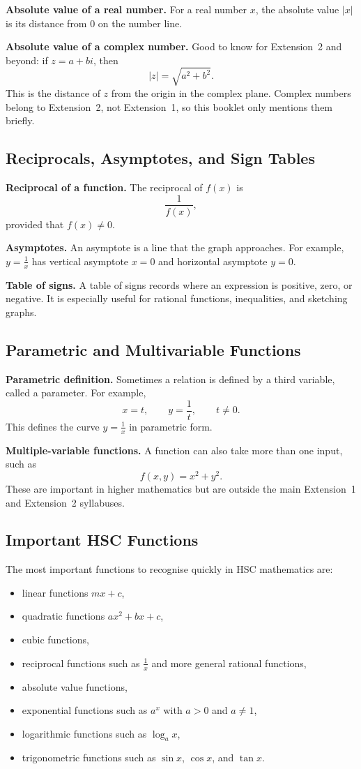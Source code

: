 \documentclass[12pt]{article}
\theoremstyle{definition}
\begin{document}
\textbf{Absolute value of a real number.} For a real number $x$, the absolute value $|x|$ is its distance from $0$ on the number line.

\textbf{Absolute value of a complex number.} Good to know for Extension~2 and beyond: if $z=a+bi$, then
\[
|z|=\sqrt{a^2+b^2}.
\]
This is the distance of $z$ from the origin in the complex plane. Complex numbers belong to Extension~2, not Extension~1, so this booklet only mentions them briefly.

\subsection{Reciprocals, Asymptotes, and Sign Tables}

\textbf{Reciprocal of a function.} The reciprocal of $f(x)$ is
\[
\frac{1}{f(x)},
\]
provided that $f(x) \ne 0$.

\textbf{Asymptotes.} An asymptote is a line that the graph approaches. For example, $y=\frac{1}{x}$ has vertical asymptote $x=0$ and horizontal asymptote $y=0$.

\textbf{Table of signs.} A table of signs records where an expression is positive, zero, or negative. It is especially useful for rational functions, inequalities, and sketching graphs.

\subsection{Parametric and Multivariable Functions}

\textbf{Parametric definition.} Sometimes a relation is defined by a third variable, called a parameter. For example,
\[
x=t, \qquad y=\frac{1}{t}, \qquad t \ne 0.
\]
This defines the curve $y=\frac{1}{x}$ in parametric form.

\textbf{Multiple-variable functions.} A function can also take more than one input, such as
\[
f(x,y)=x^2+y^2.
\]
These are important in higher mathematics but are outside the main Extension~1 and Extension~2 syllabuses.

\subsection{Important HSC Functions}

The most important functions to recognise quickly in HSC mathematics are:

\begin{itemize}[leftmargin=*]
  \item linear functions $mx+c$,
  \item quadratic functions $ax^2+bx+c$,
  \item cubic functions,
  \item reciprocal functions such as $\frac{1}{x}$ and more general rational functions,
  \item absolute value functions,
  \item exponential functions such as $a^x$ with $a>0$ and $a \ne 1$,
  \item logarithmic functions such as $\log_a x$,
  \item trigonometric functions such as $\sin x$, $\cos x$, and $\tan x$.
\end{itemize}
\end{document}
